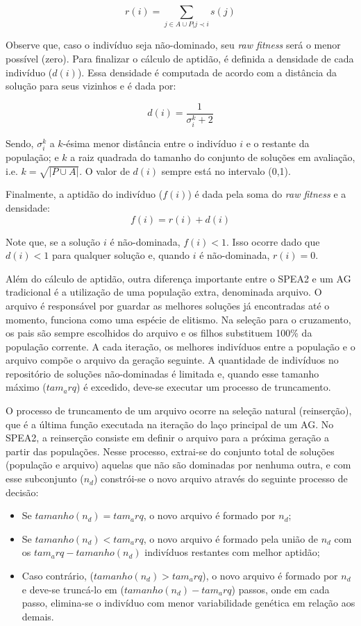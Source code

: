 \[ r(i) = \sum_{j \in A \cup P | j \prec i} s(j) \]

Observe que, caso o indivíduo seja não-dominado, seu \textit{raw fitness} será o menor possível (zero). Para finalizar o cálculo de aptidão, é definida a densidade de cada indivíduo ($d(i)$). Essa densidade é computada de acordo com a distância da solução para seus vizinhos e é dada por:

\[ d(i) = \frac{1}{\sigma_i^k + 2} \]

Sendo, $\sigma_i^k$ a $k$-ésima menor distância entre o indivíduo $i$ e o restante da população; e $k$ a raiz quadrada do tamanho do conjunto de soluções em avaliação, i.e. $k = \sqrt{|P \cup A|}$. O valor de $d(i)$ sempre está no intervalo (0,1).

Finalmente, a aptidão do indivíduo ($f(i)$) é dada pela soma do \textit{raw fitness} e a densidade: 
\[f(i) = r(i) + d(i)\]

Note que, se a solução $i$ é não-dominada, $f(i) < 1$. Isso ocorre dado que $d(i) < 1$ para qualquer solução e, quando $i$ é não-dominada, $r(i) = 0$.


Além do cálculo de aptidão, outra diferença importante entre o SPEA2 e um AG tradicional é a utilização de uma população extra, denominada arquivo. O arquivo é responsável por guardar as melhores soluções já encontradas até o momento, funciona como uma espécie de elitismo. Na seleção para o cruzamento, os pais são sempre escolhidos do arquivo e os filhos substituem 100\% da população corrente. A cada iteração, os melhores indivíduos entre a população e o arquivo compõe o arquivo da geração seguinte. A quantidade de indivíduos no repositório de soluções não-dominadas é limitada e, quando esse tamanho máximo ($tam_arq$) é excedido, deve-se executar um processo de truncamento.

O processo de truncamento de um arquivo ocorre na seleção natural (reinserção), que é a última função executada na iteração do laço principal de um AG. No SPEA2, a reinserção consiste em definir o arquivo para a próxima geração a partir das populações. Nesse processo, extrai-se do conjunto total de soluções (população e arquivo) aquelas que não são dominadas por nenhuma outra, e com esse subconjunto ($n_d$) constrói-se o novo arquivo através do seguinte processo de decisão:

\begin{itemize}  
	\item Se $tamanho(n_d) = tam_arq$, o novo arquivo é formado por $n_d$;
	\item Se $tamanho(n_d) < tam_arq$, o novo arquivo é formado pela união de $n_d$ com os $tam_arq - tamanho(n_d)$ indivíduos restantes com melhor aptidão;
	\item Caso contrário, ($tamanho(n_d) > tam_arq$), o novo arquivo é formado por $n_d$ e deve-se truncá-lo em ($tamanho(n_d) - tam_arq$) passos, onde em cada passo, elimina-se o indivíduo com menor variabilidade genética em relação aos demais.
\end{itemize}

